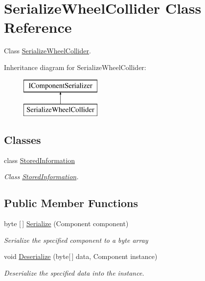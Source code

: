 \hypertarget{class_serialize_wheel_collider}{}\section{Serialize\+Wheel\+Collider Class Reference}
\label{class_serialize_wheel_collider}


Class \hyperlink{class_serialize_wheel_collider}{Serialize\+Wheel\+Collider}.  


Inheritance diagram for Serialize\+Wheel\+Collider\+:\begin{figure}[H]
\begin{center}
\leavevmode
\includegraphics[height=2.000000cm]{class_serialize_wheel_collider}
\end{center}
\end{figure}
\subsection*{Classes}
\begin{DoxyCompactItemize}
\item 
class \hyperlink{class_serialize_wheel_collider_1_1_stored_information}{Stored\+Information}
\begin{DoxyCompactList}\small\item\em Class \hyperlink{class_serialize_wheel_collider_1_1_stored_information}{Stored\+Information}. \end{DoxyCompactList}\end{DoxyCompactItemize}
\subsection*{Public Member Functions}
\begin{DoxyCompactItemize}
\item 
byte \mbox{[}$\,$\mbox{]} \hyperlink{class_serialize_wheel_collider_aeecc61865e7331afb0436aae4f53dc4d}{Serialize} (Component component)
\begin{DoxyCompactList}\small\item\em Serialize the specified component to a byte array \end{DoxyCompactList}\item 
void \hyperlink{class_serialize_wheel_collider_aa0fb4372a07823644b82f0fc968b4fcf}{Deserialize} (byte\mbox{[}$\,$\mbox{]} data, Component instance)
\begin{DoxyCompactList}\small\item\em Deserialize the specified data into the instance. \end{DoxyCompactList}\end{DoxyCompactItemize}


